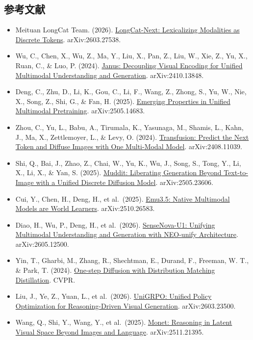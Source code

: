 \hypertarget{ux53c2ux8003ux6587ux732e-147}{%
\subsection{参考文献}\label{ux53c2ux8003ux6587ux732e-147}}

\vspace{0.25em}
\begin{itemize}
\tightlist
\item
  Meituan LongCat Team. (2026). \href{https://arxiv.org/abs/2603.27538}{LongCat-Next: Lexicalizing Modalities as Discrete Tokens}. arXiv:2603.27538.
\item
  Wu, C., Chen, X., Wu, Z., Ma, Y., Liu, X., Pan, Z., Liu, W., Xie, Z., Yu, X., Ruan, C., \& Luo, P. (2024). \href{https://arxiv.org/abs/2410.13848}{Janus: Decoupling Visual Encoding for Unified Multimodal Understanding and Generation}. arXiv:2410.13848.
\item
  Deng, C., Zhu, D., Li, K., Gou, C., Li, F., Wang, Z., Zhong, S., Yu, W., Nie, X., Song, Z., Shi, G., \& Fan, H. (2025). \href{https://arxiv.org/abs/2505.14683}{Emerging Properties in Unified Multimodal Pretraining}. arXiv:2505.14683.
\item
  Zhou, C., Yu, L., Babu, A., Tirumala, K., Yasunaga, M., Shamis, L., Kahn, J., Ma, X., Zettlemoyer, L., \& Levy, O. (2024). \href{https://arxiv.org/abs/2408.11039}{Transfusion: Predict the Next Token and Diffuse Images with One Multi-Modal Model}. arXiv:2408.11039.
\item
  Shi, Q., Bai, J., Zhao, Z., Chai, W., Yu, K., Wu, J., Song, S., Tong, Y., Li, X., Li, X., \& Yan, S. (2025). \href{https://arxiv.org/abs/2505.23606}{Muddit: Liberating Generation Beyond Text-to-Image with a Unified Discrete Diffusion Model}. arXiv:2505.23606.
\item
  Cui, Y., Chen, H., Deng, H., et al.~(2025). \href{https://arxiv.org/abs/2510.26583}{Emu3.5: Native Multimodal Models are World Learners}. arXiv:2510.26583.
\item
  Diao, H., Wu, P., Deng, H., et al.~(2026). \href{https://arxiv.org/abs/2605.12500}{SenseNova-U1: Unifying Multimodal Understanding and Generation with NEO-unify Architecture}. arXiv:2605.12500.
\item
  Yin, T., Gharbi, M., Zhang, R., Shechtman, E., Durand, F., Freeman, W. T., \& Park, T. (2024). \href{https://arxiv.org/abs/2311.18828}{One-step Diffusion with Distribution Matching Distillation}. CVPR.
\item
  Liu, J., Ye, Z., Yuan, L., et al.~(2026). \href{https://arxiv.org/abs/2603.23500}{UniGRPO: Unified Policy Optimization for Reasoning-Driven Visual Generation}. arXiv:2603.23500.
\item
  Wang, Q., Shi, Y., Wang, Y., et al.~(2025). \href{https://arxiv.org/abs/2511.21395}{Monet: Reasoning in Latent Visual Space Beyond Images and Language}. arXiv:2511.21395.
\end{itemize}

